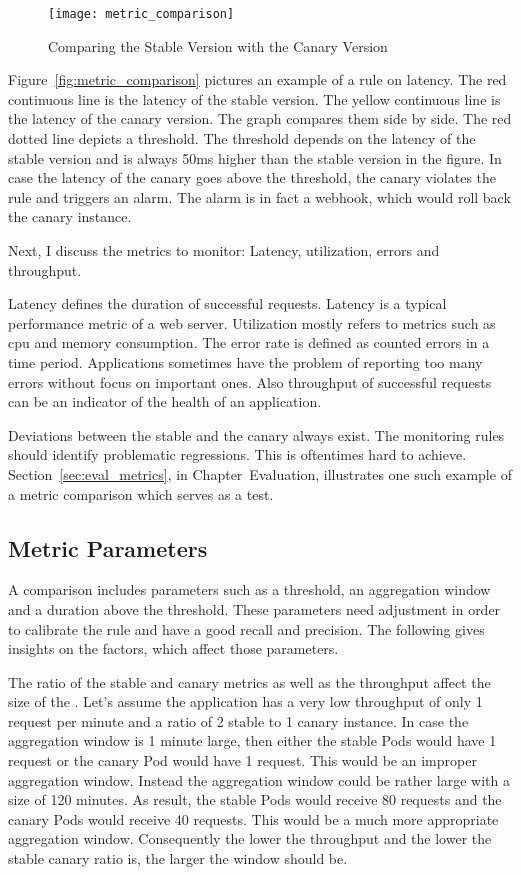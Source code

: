 \begin{figure}[htbp]
  \centering
  \texttt{[image: metric\_comparison]}
  \caption{Comparing the Stable Version with the Canary Version}
  \label{fig:metrics_comparison}
\end{figure}

Figure~\ref{fig:metric_comparison} pictures an example of a rule on latency. The red
continuous line is the latency of the stable version. The yellow continuous line is the
latency of the canary version. The graph compares them side by side. The red dotted line
depicts a threshold. The threshold depends on the latency of the stable version and is
always 50ms higher than the stable version in the figure. In case the latency of the
canary goes above the threshold, the canary violates the rule and triggers an alarm. The
alarm is in fact a webhook, which would roll back the canary instance.

Next, I discuss the metrics to monitor: Latency, utilization, errors and throughput.

Latency defines the duration of successful requests. Latency is a typical performance
metric of a web server. Utilization mostly refers to metrics such as \gls{cpu} and memory
consumption. The error rate is defined as counted errors in a time period. Applications
sometimes have the problem of reporting too many errors without focus on important
ones. Also throughput of successful requests can be an indicator of the health of an
application.

Deviations between the stable and the canary always exist. The monitoring rules should
identify problematic regressions. This is oftentimes hard to
achieve. Section~\ref{sec:eval_metrics}, in Chapter~Evaluation, illustrates one such
example of a metric comparison which serves as a test.

\subsection{Metric Parameters}

A comparison includes parameters such as a threshold, an aggregation window and a duration
above the threshold. These parameters need adjustment in order to calibrate the rule and
have a good recall and precision. The following gives insights on the factors, which
affect those parameters.

The ratio of the stable and canary metrics as well as the throughput affect the size of
the . Let's assume the application has a very low throughput of
only 1 request per minute and a ratio of 2 stable to 1 canary instance. In case the
aggregation window is 1 minute large, then either the stable Pods would have 1 request or
the canary Pod would have 1 request. This would be an improper aggregation window. Instead
the aggregation window could be rather large with a size of 120 minutes. As result, the
stable Pods would receive 80 requests and the canary Pods would receive 40 requests. This
would be a much more appropriate aggregation window. Consequently the lower the throughput
and the lower the stable canary ratio is, the larger the window should be.

